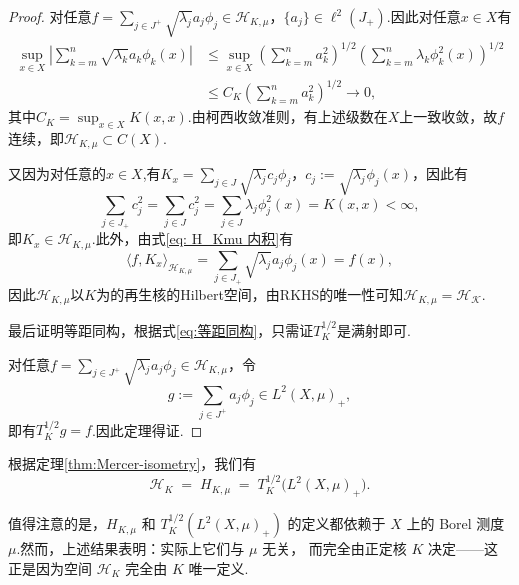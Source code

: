 \documentclass[../master.tex]{subfiles}
\begin{document}
\begin{proof}
    对任意$f = \sum_{j\in J^+}\sqrt{\lambda_j}a_j\phi_j\in \mathcal{H}_{K,\mu}$，$\{a_j\}\in \ell^2(J_+)$.因此对任意$x\in X$有
    \begin{align*}
        \sup_{x\in X} \left|\sum_{k=m}^n \sqrt{\lambda_k}a_k\phi_k(x)\right|&\leq \sup_{x\in X}\left(\sum_{k=m}^na_k^2\right)^{1/2}\left(\sum_{k=m}^n\lambda_k\phi^2_k(x)\right)^{1/2}\\
        &\leq C_K\left(\sum_{k=m}^na_k^2\right)^{1/2}\to 0,
    \end{align*}
其中$C_K = \sup_{x\in X}K(x,x)$.由柯西收敛准则，有上述级数在$X$上一致收敛，故$f$连续，即$\mathcal{H}_{K,\mu}\subset C(X).$

又因为对任意的$x\in X$,有$K_x = \sum_{j\in J}\sqrt{\lambda_j}c_j\phi_j$，$c_j:=\sqrt{\lambda_j}\phi_j(x)$，因此有
\begin{equation*}
    \sum_{j\in J_+}c_j^2 = \sum_{j\in J}c_j^2 = \sum_{j\in J}\lambda_j\phi_j^2(x) = K(x,x)<\infty,
\end{equation*}
即$K_x\in \mathcal{H}_{K,\mu}.$此外，由式\eqref{eq: H_Kmu 内积}有
\begin{equation*}
    \langle f,K_x\rangle_{\mathcal{H}_{K,\mu}}=\sum_{j\in J_+}\sqrt{\lambda_j}a_j\phi_j(x) = f(x),
\end{equation*}
因此$\mathcal{H}_{K,\mu}$以$K$为的再生核的Hilbert空间，由RKHS的唯一性可知$\mathcal{H}_{K,\mu}=\mathcal{H_K}.$

最后证明等距同构，根据式\eqref{eq:等距同构}，只需证$T_K^{1/2}$是满射即可.

对任意$f = \sum_{j\in J^+}\sqrt{\lambda_j}a_j\phi_j\in \mathcal{H}_{K,\mu}$，令$$g:=\sum_{j\in J^+}a_j\phi_j\in L^2(X,\mu)_+,$$即有$T_K^{1/2}g = f$.因此定理得证.
\end{proof}
根据定理\ref{thm:Mercer-isometry}，我们有
\[
\mathcal{H}_K \;=\; H_{K,\mu} \;=\; T_K^{1/2}\big(L^{2}(X,\mu)_{+}\big).
\]

值得注意的是，$H_{K,\mu}$ 和 $T_K^{1/2}\!\left(L^{2}(X,\mu)_{+}\right)$ 的定义都依赖于
$X$ 上的 Borel 测度 $\mu$.然而，上述结果表明：实际上它们与 $\mu$ 无关，
而完全由正定核 $K$ 决定——这正是因为空间 $\mathcal{H}_K$ 完全由 $K$ 唯一定义.
\end{document}
